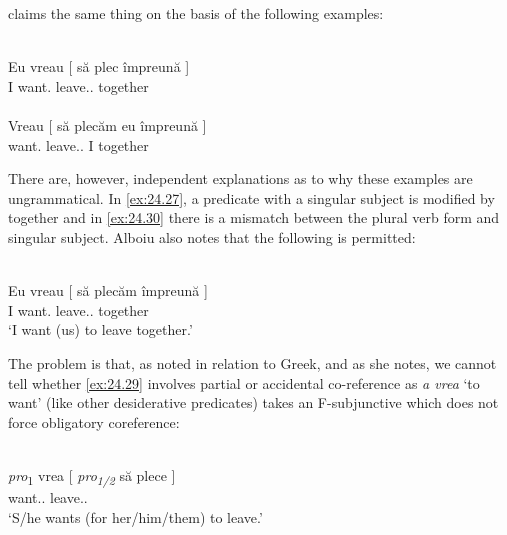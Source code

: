 \documentclass[output=paper]{langsci/langscibook}
\begin{document}
\ea%
    \label{ex:24.26} 
	\z
\z

\citet[10]{Alboiu2007} claims the same thing on the basis of the following
examples:

\ea%
\label{ex:24.27}\\
	\gll \llap{*}Eu vreau   [ să   plec      împreună ]\\
        I   want.\Fsg{} {} \Sbjv{}   leave.\Sbjv{}.\Fsg{}  together\\
\ex%
\label{ex:24.28}\\
	\gll \llap{*}Vreau     [ să   plecăm       eu  împreună ]\\
    want.\Fsg{} {}  \Sbjv{}   leave.\Sbjv{}.\Fpl{}   I  together\\
\z

There are, however, independent explanations as to why these examples are
ungrammatical. In \eqref{ex:24.27}, a predicate with a singular subject is modified by
together and in \eqref{ex:24.30} there is a mismatch between the plural verb form and
singular subject. Alboiu also notes that the following is permitted:

\ea%
\label{ex:24.29}  \citep[10]{Alboiu2007}\\
	\gll Eu vreau     [ să   plecăm      împreună ]\\
    I   want.\Fsg{} {} \Sbjv{}   leave.\Sbjv{}.\Fpl{}   together\\
	\glt ‘I want (us) to leave together.’
\z

The problem is that, as noted in relation to Greek, and as she notes, we cannot
tell whether \eqref{ex:24.29} involves partial  or accidental co-reference as
\emph{a vrea} ‘to want’ (like other desiderative predicates) takes an
F-subjunctive which does not force obligatory coreference:

\ea%
    \label{ex:24.30}  \citep[11]{Alboiu2007}\\
	\gll \emph{pro}\textsubscript{1}   vrea       [ \emph{pro\textsubscript{1/2}} să   plece ]\\
        {} want.\Prs.\Tsg{}  {} {} \Sbjv{}   leave.\Sbjv{}.\Third{}\\
	\glt ‘S/he wants (for her/him/them) to leave.’
\z
\end{document}
